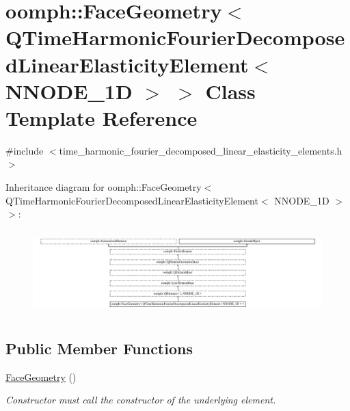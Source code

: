 \hypertarget{classoomph_1_1FaceGeometry_3_01QTimeHarmonicFourierDecomposedLinearElasticityElement_3_01NNODE__1D_01_4_01_4}{}\section{oomph\+:\+:Face\+Geometry$<$ Q\+Time\+Harmonic\+Fourier\+Decomposed\+Linear\+Elasticity\+Element$<$ N\+N\+O\+D\+E\+\_\+1D $>$ $>$ Class Template Reference}
\label{classoomph_1_1FaceGeometry_3_01QTimeHarmonicFourierDecomposedLinearElasticityElement_3_01NNODE__1D_01_4_01_4}


{\ttfamily \#include $<$time\+\_\+harmonic\+\_\+fourier\+\_\+decomposed\+\_\+linear\+\_\+elasticity\+\_\+elements.\+h$>$}

Inheritance diagram for oomph\+:\+:Face\+Geometry$<$ Q\+Time\+Harmonic\+Fourier\+Decomposed\+Linear\+Elasticity\+Element$<$ N\+N\+O\+D\+E\+\_\+1D $>$ $>$\+:\begin{figure}[H]
\begin{center}
\leavevmode
\includegraphics[height=3.283082cm]{classoomph_1_1FaceGeometry_3_01QTimeHarmonicFourierDecomposedLinearElasticityElement_3_01NNODE__1D_01_4_01_4}
\end{center}
\end{figure}
\subsection*{Public Member Functions}
\begin{DoxyCompactItemize}
\item 
\hyperlink{classoomph_1_1FaceGeometry_3_01QTimeHarmonicFourierDecomposedLinearElasticityElement_3_01NNODE__1D_01_4_01_4_a21a482e2d6670de021327e4f5c4dc784}{Face\+Geometry} ()
\begin{DoxyCompactList}\small\item\em Constructor must call the constructor of the underlying element. \end{DoxyCompactList}\end{DoxyCompactItemize}
